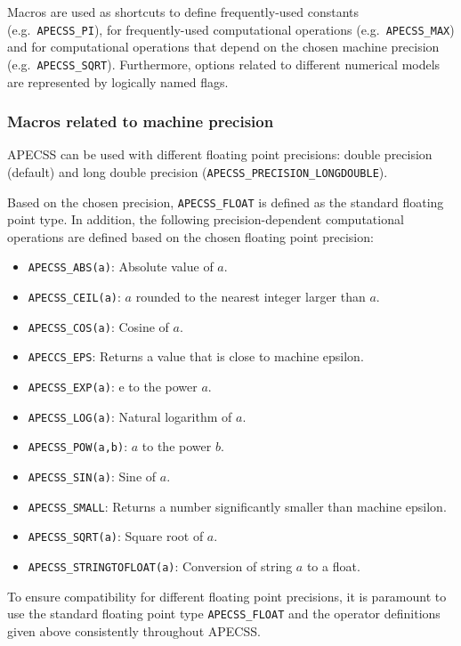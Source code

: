 Macros are used as shortcuts to define frequently-used constants (e.g.~{\tt APECSS\_PI}), for frequently-used computational operations (e.g.~{\tt APECSS\_MAX}) and for computational operations that depend on the chosen machine precision (e.g.~{\tt APECSS\_SQRT}). Furthermore, options related to different numerical models are represented by logically named flags.

\subsubsection{Macros related to machine precision}

APECSS can be used with different floating point precisions: double precision (default) and long double precision ({\tt APECSS\_PRECISION\_LONGDOUBLE}).

Based on the chosen precision, {\tt APECSS\_FLOAT} is defined as the standard floating point type. In addition, the following precision-dependent computational operations are defined based on the chosen floating point precision:\vspace{-1em}
\begin{itemize}[noitemsep]
  \item {\tt APECSS\_ABS(a)}: Absolute value of $a$.
  \item {\tt APECSS\_CEIL(a)}: $a$ rounded to the nearest integer larger than $a$.
  \item {\tt APECSS\_COS(a)}: Cosine of $a$.
  \item {\tt APECCS\_EPS}: Returns a value that is close to machine epsilon.
  \item {\tt APECSS\_EXP(a)}: $\text{e}$ to the power $a$.
  \item {\tt APECSS\_LOG(a)}: Natural logarithm of $a$.
  \item {\tt APECSS\_POW(a,b)}: $a$ to the power $b$.
  \item {\tt APECSS\_SIN(a)}: Sine of $a$.
  \item {\tt APECSS\_SMALL}: Returns a number significantly smaller than machine epsilon.
  \item {\tt APECSS\_SQRT(a)}: Square root of $a$.
  \item {\tt APECSS\_STRINGTOFLOAT(a)}: Conversion of string $a$ to a float.
\end{itemize}
To ensure compatibility for different floating point precisions, it is paramount to use the standard floating point type {\tt APECSS\_FLOAT} and the operator definitions given above consistently throughout APECSS.

